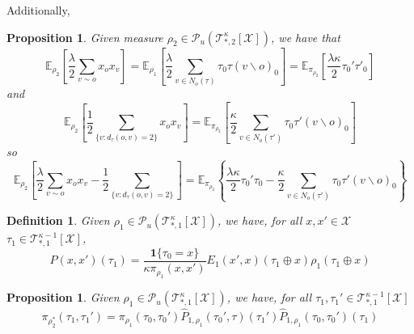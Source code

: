 \documentclass[12pt]{article}
\newtheorem{proposition}[theorem]{Proposition}
\newtheorem{definition}[theorem]{Definition}
\newcommand{\one}[1]{\mathbf{1}\{#1\}}
\newcommand{\tree}[2]{\mathcal{T}_{*, #1}^{#2}[\mathcal{X}]}
\newcommand{\measure}[2]{\mathcal{P}_u(\mathcal{T}_{*, #1}^{#2}[\mathcal{X}])}
\numberwithin{equation}{section}
\begin{document}
Additionally,
\begin{proposition}
    Given measure $\rho_2\in\measure{2}{\kappa}$, we have that
    \begin{equation*}
        \mathbb{E}_{\rho_2}\left[\frac\lambda2\sum_{v\sim o} x_o x_v\right] = \mathbb{E}_{\rho_1}\left[\frac\lambda2\sum_{v\in N_o(\tau)} \tau_0\tau(v\backslash o)_0\right] = \mathbb{E}_{\pi_{\rho_2}}\left[\frac{\lambda\kappa}2\tau_0'\tau'_0\right]
    \end{equation*}
    and
    \begin{equation*}
        \mathbb{E}_{\rho_2}\left[\frac12\sum_{\{v:d_\tau(o, v)=2\}} x_o x_v\right] = \mathbb{E}_{\pi_{\rho_2}}\left[\frac\kappa 2\sum_{v\in N_o(\tau')} \tau_0\tau'(v\backslash o)_0\right]
    \end{equation*}
    so
    \begin{equation*}
        \mathbb{E}_{\rho_2}\left[\frac\lambda2\sum_{v\sim o} x_o x_v - \frac12\sum_{\{v:d_\tau(o, v)=2\}}\right] =\mathbb{E}_{\pi_{\rho_2}}
        \left\{\frac{\lambda\kappa}2\tau_0'\tau_0 - \frac\kappa 2\sum_{v\in N_o(\tau')} \tau_0\tau'(v\backslash o)_0\right\}
    \end{equation*}
\end{proposition}

\begin{definition}
    Given $\rho_1 \in \mathcal{P}_u(\tree{1}{\kappa})$, we have, for all $x, x' \in \mathcal{X}$ $\tau_1 \in \tree{1}{\kappa-1}$,
    \begin{equation*}
        \widehat{P}(x, x')(\tau_1) = \frac{\one{\tau_0 = x}}{\kappa \pi_{\rho_1}(x, x')} E_1(x', x)(\tau_1\oplus x) \rho_1(\tau_1\oplus x)
    \end{equation*}
\end{definition}

\begin{proposition}
    Given $\rho_1 \in \mathcal{P}_u(\tree{1}{\kappa})$, we have, for all $\tau_1, \tau_1' \in \tree{1}{\kappa-1}$
    \begin{equation}\label{Eq.NNNI-pi-rho2-star}
        \pi_{\rho_2^*}(\tau_1, \tau_1') = \pi_{\rho_1}(\tau_0, \tau_0')\widehat{P}_{1, \rho_1}(\tau_0', \tau)(\tau_1')\widehat{P}_{1, \rho_1}(\tau_0, \tau_0')(\tau_1)
    \end{equation}
\end{proposition}
\end{document}
